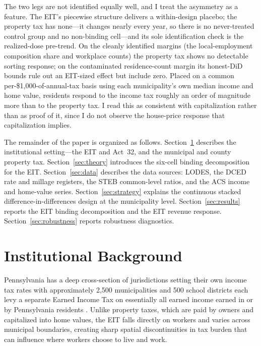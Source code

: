 \documentclass[12pt]{article}
\begin{document}
The two legs are not identified equally well, and I treat the asymmetry
as a feature. The EIT's piecewise structure delivers a within-design
placebo; the property tax has none---it changes nearly every year, so
there is no never-treated control group and no non-binding cell---and
its sole identification check is the realized-dose pre-trend. On the
cleanly identified margins (the local-employment composition share and
workplace counts) the property tax shows no detectable sorting response;
on the contaminated residence-count margin its honest-DiD bounds rule
out an EIT-sized effect but include zero. Placed on a common
per-\$1{,}000-of-annual-tax basis using each municipality's own median
income and home value, residents respond to the income tax roughly an
order of magnitude more than to the property tax. I read this as
consistent with capitalization rather than as proof of it, since I do
not observe the house-price response that capitalization implies.

The remainder of the paper is organized as follows.
Section~\ref{sec:background} describes the institutional setting---the
EIT and Act~32, and the municipal and county property tax.
Section~\ref{sec:theory} introduces the six-cell binding decomposition
for the EIT. Section~\ref{sec:data} describes the data sources: LODES,
the DCED rate and millage registers, the STEB common-level ratios, and
the ACS income and home-value series. Section~\ref{sec:strategy}
explains the continuous stacked difference-in-differences design at the
municipality level. Section~\ref{sec:results} reports the
EIT binding decomposition and the EIT revenue response.
Section~\ref{sec:robustness} reports robustness diagnostics.

\section{Institutional Background}
\label{sec:background}

Pennsylvania has a deep cross-section of jurisdictions setting
their own income tax rates with approximately 2{,}500 municipalities and 500 school
districts each levy a separate Earned Income Tax on essentially
all earned income earned in or by Pennsylvania residents
\citep{bagchiEffectsIntroducingWithholding2022,agrawalLessonsStateLocal}.
Unlike property taxes, which are paid by owners and capitalized into
home values, the EIT falls directly on workers and varies across
municipal boundaries, creating
sharp spatial discontinuities in tax burden that can influence where
workers choose to live and work.
\end{document}
